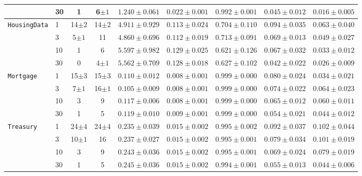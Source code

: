 \begin{table*}[htbp]
\begin{tabular}{l l c c c c c c c}
                                     & 30 & 1 & 6$\pm1$ & $1.240\pm0.061$ & $0.022\pm0.001$ & $0.992\pm0.001$ & $\mathbf{0.045}\pm0.012$ & $\mathbf{0.016}\pm0.005$ \\
    \midrule
    \multirow{4}{*}{\texttt{HousingData}} & 1 & 14$\pm2$ & 14$\pm2$ & $4.911\pm0.929$ & $0.113\pm0.024$ & $0.704\pm0.110$ & $0.094\pm0.035$ & $0.063\pm0.040$ \\
                                     & 3 & 5$\pm1$ & 11 & $\mathbf{4.860}\pm0.696$ & $\mathbf{0.112}\pm0.019$ & $\mathbf{0.713}\pm0.091$ & $0.069\pm0.013$ & $0.049\pm0.027$ \\
                                     & 10 & 1 & 6 & $5.597\pm0.982$ & $0.129\pm0.025$ & $0.621\pm0.126$ & $0.067\pm0.032$ & $0.033\pm0.012$ \\
                                     & 30 & 0 & 4$\pm1$ & $5.562\pm0.709$ & $0.128\pm0.018$ & $0.627\pm0.102$ & $\mathbf{0.042}\pm0.022$ & $\mathbf{0.026}\pm0.009$ \\
    \midrule
    \multirow{4}{*}{\texttt{Mortgage}} & 1 & 15$\pm3$ & 15$\pm3$ & $0.110\pm0.012$ & $0.008\pm0.001$ & $0.999\pm0.000$ & $0.080\pm0.024$ & $\mathbf{0.034}\pm0.021$ \\
                                     & 3 & 7$\pm1$ & 16$\pm1$ & $\mathbf{0.105}\pm0.009$ & $\mathbf{0.008}\pm0.001$ & $\mathbf{0.999}\pm0.000$ & $0.074\pm0.022$ & $0.064\pm0.023$ \\
                                     & 10 & 3 & 9 & $0.117\pm0.006$ & $0.008\pm0.001$ & $0.999\pm0.000$ & $0.065\pm0.012$ & $0.060\pm0.011$ \\
                                     & 30 & 1 & 5 & $0.119\pm0.010$ & $0.009\pm0.001$ & $0.999\pm0.000$ & $\mathbf{0.054}\pm0.021$ & $0.044\pm0.012$ \\
    \midrule
    \multirow{4}{*}{\texttt{Treasury}} & 1 & 24$\pm4$ & 24$\pm4$ & $\mathbf{0.235}\pm0.039$ & $\mathbf{0.015}\pm0.002$ & $\mathbf{0.995}\pm0.002$ & $0.092\pm0.037$ & $0.102\pm0.044$ \\
                                     & 3 & 10$\pm1$ & 16 & $0.237\pm0.027$ & $0.015\pm0.002$ & $0.995\pm0.001$ & $0.079\pm0.034$ & $0.101\pm0.019$ \\
                                     & 10 & 3 & 9 & $0.243\pm0.036$ & $0.015\pm0.002$ & $0.995\pm0.001$ & $0.069\pm0.024$ & $0.079\pm0.019$ \\
                                     & 30 & 1 & 5 & $0.245\pm0.036$ & $0.015\pm0.002$ & $0.994\pm0.001$ & $\mathbf{0.055}\pm0.013$ & $\mathbf{0.044}\pm0.006$ \\

\end{tabular}
\end{table*}
